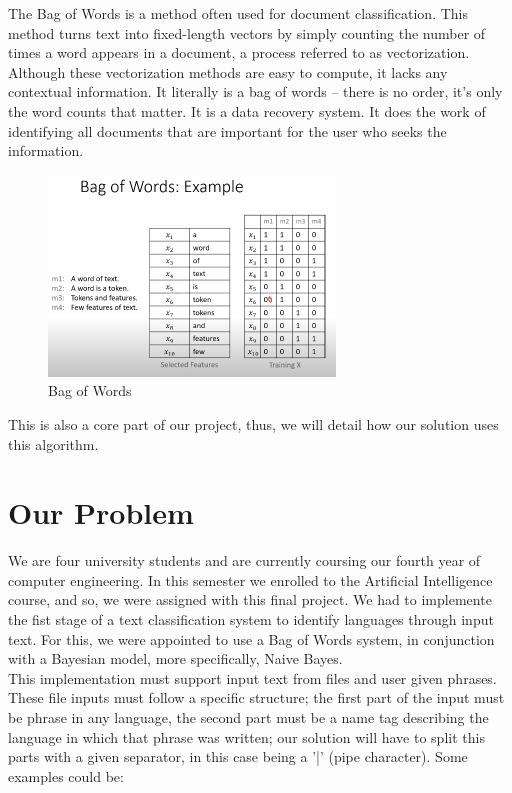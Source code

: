 \documentclass[sigconf,12pt,review=false,natbib=false]{acmart}
\begin{document}
The Bag of Words is a method often used for document classification. This method turns text into fixed-length
vectors by simply counting the number of times a word appears in a document, a process referred to as vectorization. \\

Although these vectorization methods are easy to compute, it lacks any contextual information. It literally is a bag
of words – there is no order, it’s only the word counts that matter.
It is a data recovery system. It does the work of identifying all documents that are important for the user who
seeks the information. \\

\begin{figure}[h!]
    \centering
    \includegraphics[width=3in]{bow}
    \caption{Bag of Words}
    \label{fig:bow}
\end{figure}

This is also a core part of our project, thus, we will detail how our solution uses this algorithm.

\section{Our Problem}

We are four university students and are currently coursing our fourth year of computer engineering. In this semester
we enrolled to the Artificial Intelligence course, and so, we were assigned with this final project. We had to 
implemente the fist stage of a text classification system to identify languages through input text.
For this, we were appointed to use a Bag of Words system, in conjunction with a Bayesian model, more specifically,
Naive Bayes. \\

This implementation must support input text from files and user given phrases. These file inputs must follow a specific
structure; the first part of the input must be phrase in any language, the second part must be a name tag describing
the language in which that phrase was written; our solution will have to split this parts with a given separator,
in this case being a '|' (pipe character). Some examples could be: \\ 
\end{document}
